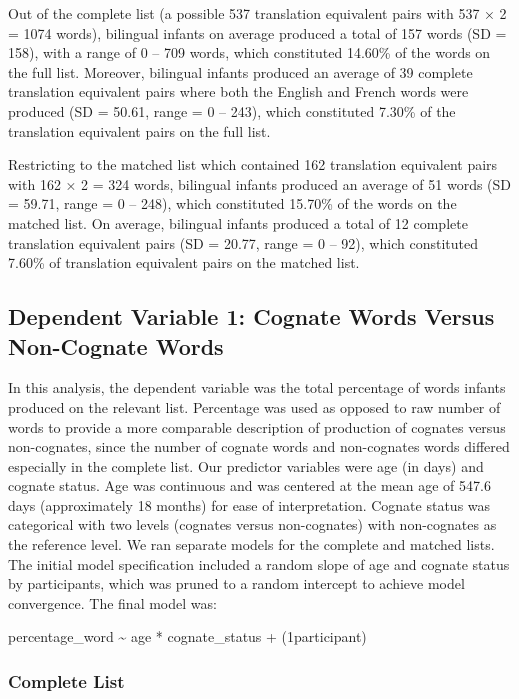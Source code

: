 \documentclass[
  english,
  ,man,floatsintext]{apa6}
\begin{document}
Out of the complete list (a possible 537 translation equivalent pairs with 537 × 2 = 1074 words), bilingual infants on average produced a total of 157 words (SD = 158), with a range of 0 -- 709 words, which constituted 14.60\% of the words on the full list. Moreover, bilingual infants produced an average of 39 complete translation equivalent pairs where both the English and French words were produced (SD = 50.61, range = 0 -- 243), which constituted 7.30\% of the translation equivalent pairs on the full list.

Restricting to the matched list which contained 162 translation equivalent pairs with 162 × 2 = 324 words, bilingual infants produced an average of 51 words (SD = 59.71, range = 0 -- 248), which constituted 15.70\% of the words on the matched list. On average, bilingual infants produced a total of 12 complete translation equivalent pairs (SD = 20.77, range = 0 -- 92), which constituted 7.60\% of translation equivalent pairs on the matched list.

\hypertarget{dependent-variable-1-cognate-words-versus-non-cognate-words}{%
\subsection{Dependent Variable 1: Cognate Words Versus Non-Cognate Words}\label{dependent-variable-1-cognate-words-versus-non-cognate-words}}

In this analysis, the dependent variable was the total percentage of words infants produced on the relevant list. Percentage was used as opposed to raw number of words to provide a more comparable description of production of cognates versus non-cognates, since the number of cognate words and non-cognates words differed especially in the complete list. Our predictor variables were age (in days) and cognate status. Age was continuous and was centered at the mean age of 547.6 days (approximately 18 months) for ease of interpretation. Cognate status was categorical with two levels (cognates versus non-cognates) with non-cognates as the reference level. We ran separate models for the complete and matched lists. The initial model specification included a random slope of age and cognate status by participants, which was pruned to a random intercept to achieve model convergence. The final model was:

percentage\_word \textasciitilde{} age * cognate\_status + (1\textbar participant)

\hypertarget{complete-list}{%
\subsubsection{Complete List}\label{complete-list}}
\end{document}
